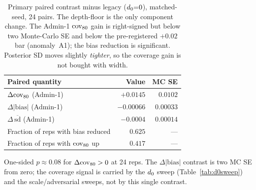 \begin{table}[t]
\centering
\small
\caption{Primary paired contrast \bartsimpsd{} minus legacy \bartsimp{} ($d_0{=}0$),
matched-seed, 24 pairs. The depth-floor is the only component change. The
Admin-1 $\mathrm{cov}_{80}$ gain is right-signed but below two Monte-Carlo SE and below the
pre-registered $+0.02$ bar (anomaly~A1); the bias reduction is significant. Posterior
SD moves slightly \emph{tighter}, so the coverage gain is not bought with width.}
\label{tab:deltas}
\begin{tabular}{l r r}
\toprule
Paired quantity & Value & MC SE \\
\midrule
$\Delta\mathrm{cov}_{80}$ (Admin-1)            & $+0.0145$ & $0.0102$ \\
$\Delta|\mathrm{bias}|$ (Admin-1)      & $-0.00066$ & $0.00033$ \\
$\Delta\,\overline{\mathrm{sd}}$ (Admin-1) & $-0.0004$ & $0.00014$ \\
Fraction of reps with bias reduced     & $0.625$ & --- \\
Fraction of reps with $\mathrm{cov}_{80}$ up   & $0.417$ & --- \\
\bottomrule
\end{tabular}

\vspace{2pt}
{\footnotesize One-sided $p\approx0.08$ for $\Delta\mathrm{cov}_{80}>0$ at 24 reps. The
$\Delta|\mathrm{bias}|$ contrast is two MC SE from zero; the coverage signal is
carried by the $d_0$ sweep (Table~\ref{tab:d0sweep}) and the scale/adversarial
sweeps, not by this single contrast.}
\end{table}
